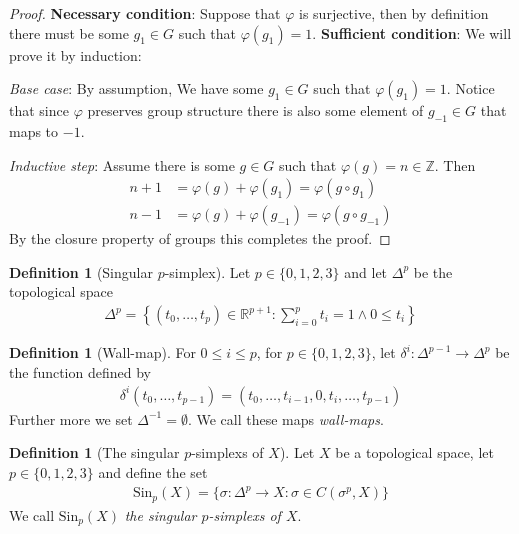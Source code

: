 \documentclass{article}
\theoremstyle{plain}
\theoremstyle{definition}
\newtheorem{definition}[theorem]{Definition}
\newcommand{\R}{\mathbb{R}}
\newcommand{\Z}{\mathbb{Z}}
\newcommand{\Sin}{\text{Sin}}
\begin{document}
\begin{proof}
\textbf{Necessary condition}: Suppose that $\varphi$ is surjective, then by
definition there must be some $g_1\in G$ such that $\varphi(g_1)=1$.
\newline\newline
\textbf{Sufficient condition}: We will prove it by induction:

\textit{Base case}: By assumption, We have some $g_1\in G$ such that
$\varphi(g_1)=1$. Notice that since $\varphi$ preserves group structure there is
also some element of $g_{-1}\in G$ that maps to $-1$.

\textit{Inductive step}: Assume there is some $g\in G$ such that
$\varphi(g)=n\in \Z$. Then
\begin{equation}
\begin{aligned}
	n+1&=\varphi(g)+\varphi(g_1)=\varphi(g\circ g_1) \\
	n-1&=\varphi(g)+\varphi(g_{-1})=\varphi(g\circ g_{-1})
\end{aligned}
\end{equation}
By the closure property of groups this completes the proof.
\end{proof}
\begin{definition}[Singular $p$-simplex]\label{singular p-simplex}
	Let $p\in\{0,1,2,3\}$ and let $\Delta^p$ be the topological space
	\begin{equation}
	\begin{aligned}
		\Delta^p = \left\{ (t_0,\dots,t_p)\in\R^{p+1}:\sum_{i=0}^p t_i= 1\land
		0\leq t_i\right\}
	\end{aligned}
	\end{equation}
\end{definition}
\begin{definition}[Wall-map]\label{Wall-map}
	For $0\leq i\leq p$, for $p\in\{0,1,2,3\}$, let\newline 
	$\delta^i: \Delta^{p-1}\rightarrow\Delta^p$ be the function defined by
	\begin{equation}
	\begin{aligned}
		\delta^i(t_0,\dots,t_{p-1}) = (t_0,\dots,t_{i-1},0,t_{i},\dots,t_{p-1})
	\end{aligned}
	\end{equation}
	Further more we set $\Delta^{-1}=\emptyset$. We call these maps
	\textit{wall-maps}.
\end{definition}
\begin{definition}[The singular $p$-simplexs of $X$]\label{singular p-simplex x}
	Let $X$ be a topological space, let $p \in \{0,1,2,3\}$ and define the set
	\begin{equation}
	\begin{aligned}
		\Sin_p(X)=\{\sigma:\Delta^p\rightarrow X: \sigma \in C(\sigma^p,X)\}
	\end{aligned}
	\end{equation}
	We call $\Sin_p(X)$ \textit{the singular $p$-simplexs of $X$}.
\end{definition}
\end{document}
